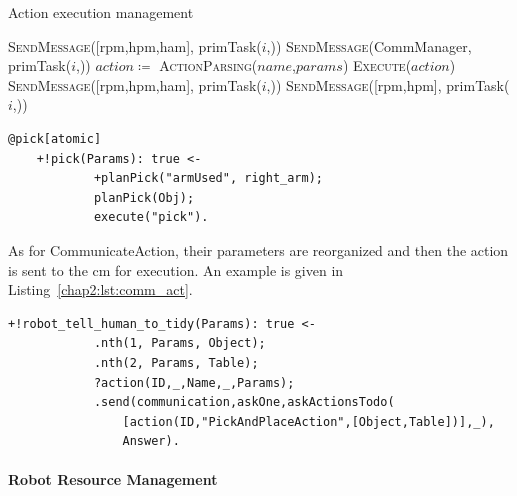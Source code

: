 \documentclass[a4paper,11pt,twoside]{StyleThese}
\begin{document}
\begin{algorithm}[!htb]
	\caption{Action execution management}
	\label{chap2:algo:exe_manage}
	\begin{algorithmic}
		\State \textsc{SendMessage}([\acrshort{rpm},\acrshort{hpm},\acrshort{ham}], primTask($i$,))
		\State \textsc{SendMessage}(CommManager, primTask($i$,))
	\EndIf
	\State $action \coloneqq$ \textsc{ActionParsing($name$,$params$)}
	\State \textsc{Execute($action$)}
		\State \textsc{SendMessage}([\acrshort{rpm},\acrshort{hpm},\acrshort{ham}], primTask($i$,))
		\State \textsc{SendMessage}([\acrshort{rpm},\acrshort{hpm}], primTask($i$,))
	\EndIf
	\EndFunction
	\end{algorithmic}
\end{algorithm}	

\begin{lstlisting}[label={chap2:lst:pick},caption=Example of a PhysicalAction for execution by the Motion Planner and Executor.]
	@pick[atomic]
	+!pick(Params): true <-
			+planPick("armUsed", right_arm);
			planPick(Obj);
			execute("pick").
\end{lstlisting}

As for CommunicateAction, their parameters are reorganized and then the action is sent to the \acrshort{cm} for execution. An example is given in Listing~\ref{chap2:lst:comm_act}.

\begin{lstlisting}[label={chap2:lst:comm_act},caption=Example of a CommunicateAction for execution by the Communication Manager.]
	+!robot_tell_human_to_tidy(Params): true <-
			.nth(1, Params, Object);
			.nth(2, Params, Table);
			?action(ID,_,Name,_,Params);
			.send(communication,askOne,askActionsTodo(
				[action(ID,"PickAndPlaceAction",[Object,Table])],_),
				Answer).
\end{lstlisting}

\paragraph{Robot Resource Management}\label{chap2:para:resource_m}
\end{document}
